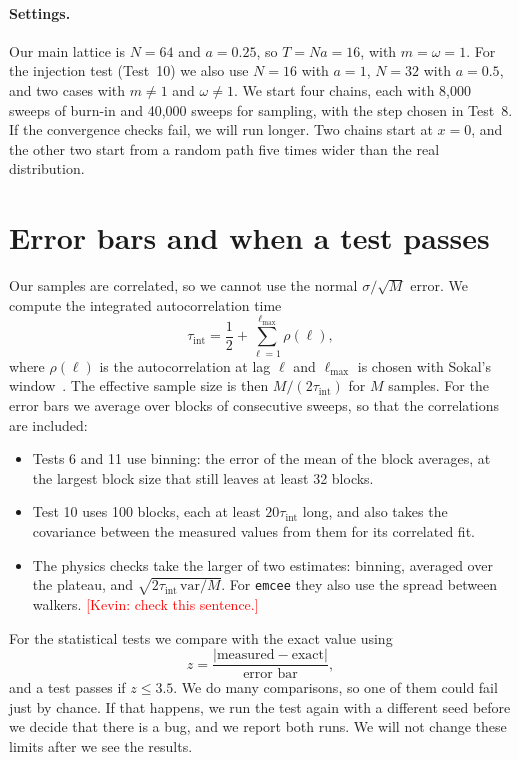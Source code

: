 \documentclass[11pt]{article}
\newcommand{\fillin}[1]{\textcolor{red}{[#1]}}
\begin{document}
\paragraph{Settings.} Our main lattice is $N = 64$ and $a = 0.25$, so $T = Na = 16$, with $m = \omega = 1$. For the injection test (Test~10) we also use $N = 16$ with $a = 1$, $N = 32$ with $a = 0.5$, and two cases with $m \ne 1$ and $\omega \ne 1$. We start four chains, each with 8,000 sweeps of burn-in and 40,000 sweeps for sampling, with the step chosen in Test~8. If the convergence checks fail, we will run longer. Two chains start at $x = 0$, and the other two start from a random path five times wider than the real distribution.

\section{Error bars and when a test passes}
Our samples are correlated, so we cannot use the normal $\sigma/\sqrt{M}$ error. We compute the integrated autocorrelation time
\begin{equation}
  \tau_{\text{int}} = \frac12 + \sum_{\ell=1}^{\ell_{\max}} \rho(\ell),
\end{equation}
where $\rho(\ell)$ is the autocorrelation at lag $\ell$ and $\ell_{\max}$ is chosen with Sokal's window~\cite{sokal}. The effective sample size is then $M/(2\tau_{\text{int}})$ for $M$ samples. For the error bars we average over blocks of consecutive sweeps, so that the correlations are included:
\begin{itemize}
  \item Tests 6 and 11 use binning: the error of the mean of the block averages, at the largest block size that still leaves at least 32 blocks.
  \item Test 10 uses 100 blocks, each at least $20\tau_{\text{int}}$ long, and also takes the covariance between the measured values from them for its correlated fit.
  \item The physics checks take the larger of two estimates: binning, averaged over the plateau, and $\sqrt{2\tau_{\text{int}}\,\mathrm{var}/M}$. For \texttt{emcee} they also use the spread between walkers. \fillin{Kevin: check this sentence.}
\end{itemize}

For the statistical tests we compare with the exact value using
\begin{equation}
  z = \frac{|\text{measured} - \text{exact}|}{\text{error bar}},
\end{equation}
and a test passes if $z \le 3.5$. We do many comparisons, so one of them could fail just by chance. If that happens, we run the test again with a different seed before we decide that there is a bug, and we report both runs. We will not change these limits after we see the results.
\end{document}

